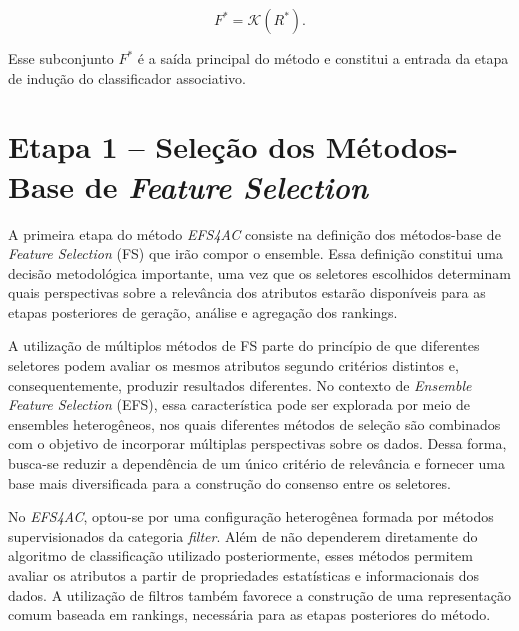 \begin{equation}
    F^{*}=\mathcal{K}(R^{*}).
    \label{eq:subconjunto-final-ac-efs}
\end{equation}

Esse subconjunto $F^{*}$ é a saída principal do método e constitui a entrada da
etapa de indução do classificador associativo.

\section{Etapa 1 -- Seleção dos Métodos-Base de \textit{Feature Selection}}
\label{sec:ac-efs-etapa1}

A primeira etapa do método \textit{EFS4AC} consiste na definição dos
métodos-base de \textit{Feature Selection} (FS) que irão compor o ensemble.
Essa definição constitui uma decisão metodológica importante, uma vez que os
seletores escolhidos determinam quais perspectivas sobre a relevância dos
atributos estarão disponíveis para as etapas posteriores de geração, análise e
agregação dos rankings.

A utilização de múltiplos métodos de FS parte do princípio de que diferentes
seletores podem avaliar os mesmos atributos segundo critérios distintos e,
consequentemente, produzir resultados diferentes. No contexto de
\textit{Ensemble Feature Selection} (EFS), essa característica pode ser
explorada por meio de ensembles heterogêneos, nos quais diferentes métodos de
seleção são combinados com o objetivo de incorporar múltiplas perspectivas
sobre os dados. Dessa forma, busca-se reduzir a dependência de um único
critério de relevância e fornecer uma base mais diversificada para a construção
do consenso entre os seletores.

No \textit{EFS4AC}, optou-se por uma configuração heterogênea formada por
métodos supervisionados da categoria \textit{filter}. Além de não dependerem
diretamente do algoritmo de classificação utilizado posteriormente, esses
métodos permitem avaliar os atributos a partir de propriedades estatísticas e
informacionais dos dados. A utilização de filtros também favorece a construção
de uma representação comum baseada em rankings, necessária para as etapas
posteriores do método.

